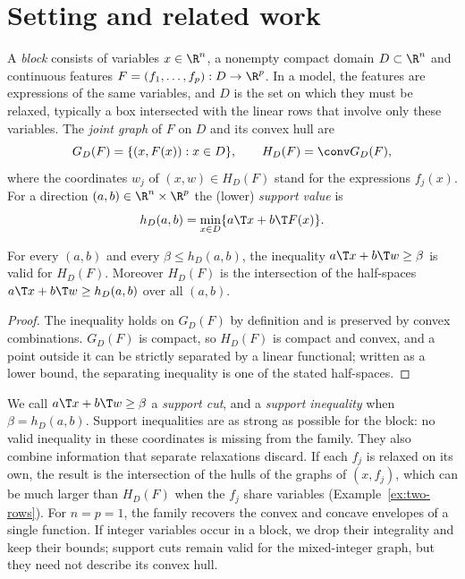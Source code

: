\section{Setting and related work}\label{sec:setting}

A \emph{block} consists of variables $x\in\R^n$, a nonempty compact domain
$D\subset\R^n$ and continuous features $F=(f_1,\dots,f_p):D\to\R^p$. In a
model, the features are expressions of the same variables, and $D$ is the
set on which they must be relaxed, typically a box intersected with the
linear rows that involve only these variables. The \emph{joint graph} of $F$
on $D$ and its convex hull are
\begin{equation}\label{eq:joint-hull}
G_D(F)=\{(x,F(x)):x\in D\},\qquad H_D(F)=\conv G_D(F),
\end{equation}
where the coordinates $w_j$ of $(x,w)\in H_D(F)$ stand for the expressions
$f_j(x)$. For a direction $(a,b)\in\R^n\times\R^p$ the (lower) \emph{support
value} is
\begin{equation}\label{eq:support}
h_D(a,b)=\min_{x\in D}\{a\T x+b\T F(x)\}.
\end{equation}

\begin{proposition}\label{prop:support}
For every $(a,b)$ and every $\beta\le h_D(a,b)$, the inequality
$a\T x+b\T w\ge\beta$ is valid for $H_D(F)$. Moreover $H_D(F)$ is the
intersection of the half-spaces $a\T x+b\T w\ge h_D(a,b)$ over all $(a,b)$.
\end{proposition}

\begin{proof}
The inequality holds on $G_D(F)$ by definition and is preserved by convex
combinations. $G_D(F)$ is compact, so $H_D(F)$ is compact and convex, and a
point outside it can be strictly separated by a linear functional; written
as a lower bound, the separating inequality is one of the stated
half-spaces.
\end{proof}

We call $a\T x+b\T w\ge\beta$ a \emph{support cut}, and a \emph{support
inequality} when $\beta=h_D(a,b)$. Support inequalities are as strong as
possible for the block: no valid inequality in these coordinates is missing
from the family. They also combine information that separate
relaxations discard. If each $f_j$ is relaxed on its own, the result is the
intersection of the hulls of the graphs of $(x,f_j)$, which can be much larger
than $H_D(F)$ when the $f_j$ share variables (Example~\ref{ex:two-rows}). For
$n=p=1$, the family recovers the convex and concave envelopes of a single
function. If integer variables occur in a block, we drop their integrality
and keep their bounds; support cuts remain valid for the mixed-integer graph,
but they need not describe its convex hull.


